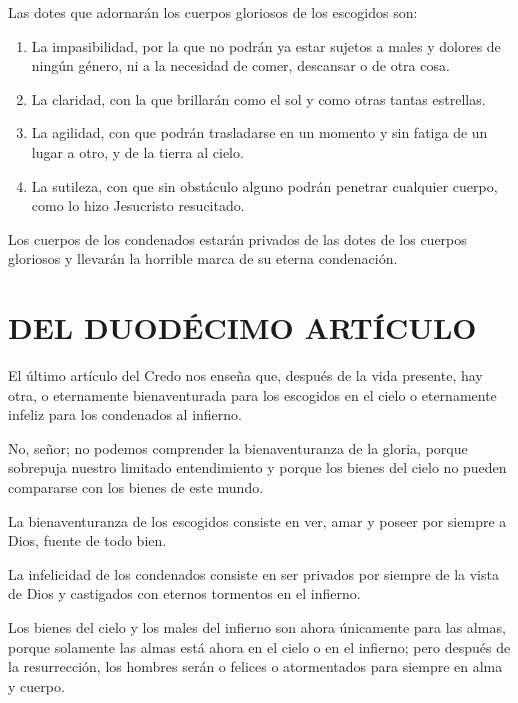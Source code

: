 Las dotes que adornarán los cuerpos gloriosos de los escogidos son: 

\begin{enumerate}
	\item La impasibilidad, por la que no podrán ya estar sujetos a males y dolores de ningún 	género, ni a la necesidad de comer, descansar o de otra cosa.
	\item La claridad, con la que brillarán como el sol y como otras tantas estrellas.
	\item La agilidad, con que 	podrán trasladarse en un momento y sin fatiga de un lugar a otro, y de la tierra al cielo.
	\item La sutileza, con que sin obstáculo alguno podrán penetrar cualquier
	cuerpo, como lo hizo Jesucristo resucitado.
\end{enumerate}

 Los cuerpos de los
condenados estarán privados de las dotes de los cuerpos gloriosos y llevarán la
horrible marca de su eterna condenación.

\section{DEL DUODÉCIMO ARTÍCULO}

 El último
artículo del Credo nos enseña que, después de la vida presente, hay otra, o
eternamente bienaventurada para los escogidos en el cielo o eternamente infeliz
para los condenados al infierno.

 No, señor; no
podemos comprender la bienaventuranza de la gloria, porque sobrepuja nuestro
limitado entendimiento y porque los bienes del cielo no pueden compararse con
los bienes de este mundo.

 La
bienaventuranza de los escogidos consiste en ver, amar y poseer por siempre a
Dios, fuente de todo bien.

 La infelicidad de
los condenados consiste en ser privados por siempre de la vista de Dios y
castigados con eternos tormentos en el infierno.

 Los bienes del cielo y los males del infierno son ahora únicamente
para las almas, porque solamente las almas está ahora en el cielo o en el infierno;
pero después de la resurrección, los hombres serán o felices o atormentados para
siempre en alma y cuerpo.

